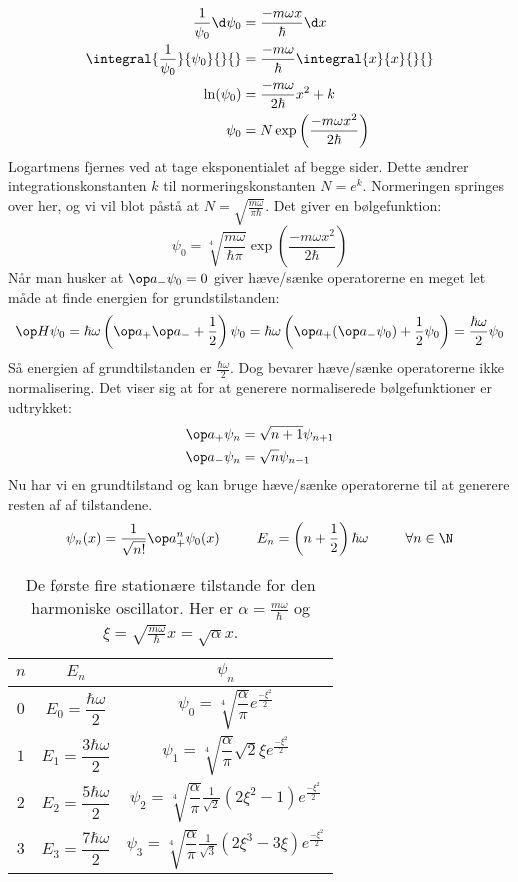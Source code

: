 \begin{align*}
\frac{1}{\psi_0}\d \psi_0 &=\frac{-m\omega x}{\hbar}\d x\\
\integral{\frac{1}{\psi_0}}{\psi_0}{}{} &= \frac{-m\omega}{\hbar}\integral{x}{x}{}{}\\
\ln(\psi_0) &= \frac{-m\omega}{2\hbar}x^2+k\\
\psi_0 &= N\exp\left({\frac{-m\omega x^2}{2\hbar}}\right)
\end{align*}
Logartmens fjernes ved at tage eksponentialet af begge sider. Dette ændrer integrationskonstanten $k$ til normeringskonstanten $N=e^k$. Normeringen springes over her, og vi vil blot påstå at $N=\sqrt{\frac{m\omega}{\pi\hbar}}$. Det giver en bølgefunktion:
\begin{equation}\label{kvant:osc0}
\psi_0 = \sqrt[4]{\frac{m\omega}{\hbar\pi}}\exp\left(\frac{-m\omega x^2}{2\hbar}\right)
\end{equation}
Når man husker at $\op a_-\psi_0 =0$ giver hæve/sænke operatorerne en meget let måde at finde energien for grundstilstanden:
$$
\op H \psi_0 = \hbar\omega\left(\op a_+\op a_- +\frac{1}{2}\right)\psi_0 = \hbar\omega\left(\op a_+(\op a_- \psi_0)+\frac{1}{2}\psi_0\right) = \frac{\hbar\omega}{2}\psi_0
$$
Så energien af grundtilstanden er $\frac{\hbar\omega}{2}$.
Dog bevarer hæve/sænke operatorerne ikke normalisering. Det viser sig at for at generere normaliserede bølgefunktioner er udtrykket:
\begin{align*}
\op a_+\psi_n &= \sqrt{n+1}\psi_{n+1}\\
\op a_- \psi_n &= \sqrt{n}\psi_{n-1}
\end{align*}
 Nu har vi en grundtilstand og kan bruge hæve/sænke operatorerne til at generere resten af af tilstandene.
\begin{equation}
\psi_n(x) = \frac{1}{\sqrt{n!}}\op a_+^n\psi_0(x)~~~~~~~~E_n = \left(n+\frac{1}{2}\right)\hbar\omega~~~~~~~~\forall n\in\N
\end{equation}
\begin{table}[h]
\center
\begin{tabular}{|c c c|}
$n$&$E_n$&$\psi_n$\\\hline
$0$ & $E_0 = \dfrac{\hbar\omega}{2}$ & $\psi_0 = \sqrt[4]{\dfrac{\alpha}{\pi}}e^{\frac{-\xi^2}{2}}$\\
$1$ & $E_1 = \dfrac{3\hbar\omega}{2}$ & $\psi_1 = \sqrt[4]{\dfrac{\alpha}{\pi}}\sqrt{2}\xi e^{\frac{-\xi^2}{2}}$\\
$2$ & $E_2 = \dfrac{5\hbar\omega}{2}$ & $\psi_2 = \sqrt[4]{\dfrac{\alpha}{\pi}}\frac{1}{\sqrt{2}} (2\xi^2-1) e^{\frac{-\xi^2}{2}}$\\
$3$ & $E_3 = \dfrac{7\hbar\omega}{2}$ & $\psi_3 = \sqrt[4]{\dfrac{\alpha}{\pi}}\frac{1}{\sqrt{3}} (2\xi^3-3\xi) e^{\frac{-\xi^2}{2}}$\\\hline
\end{tabular}
\caption{De første fire stationære tilstande for den harmoniske oscillator. Her er $\alpha = \frac{m\omega}{\hbar}$ og $\xi = \sqrt{\frac{m\omega}{\hbar}}x = \sqrt{\alpha}x$.}
\end{table}
